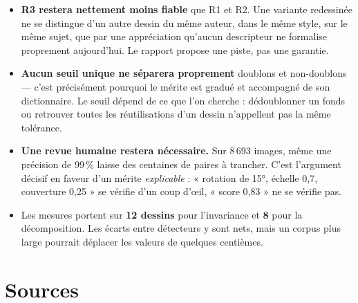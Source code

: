 \documentclass[11pt,a4paper]{article}
\newcommand{\alerte}[1]{\textcolor{alerte}{\textbf{#1}}}
\begin{document}
\begin{itemize}[leftmargin=*,itemsep=4pt]
  \item \alerte{R3 restera nettement moins fiable} que R1 et R2. Une variante
  redessinée ne se distingue d'un autre dessin du même auteur, dans le même
  style, sur le même sujet, que par une appréciation qu'aucun descripteur ne
  formalise proprement aujourd'hui. Le rapport propose une piste, pas une
  garantie.

  \item \textbf{Aucun seuil unique ne séparera proprement} doublons et
  non-doublons — c'est précisément pourquoi le mérite est gradué et accompagné
  de son dictionnaire. Le seuil dépend de ce que l'on cherche : dédoublonner un
  fonds ou retrouver toutes les réutilisations d'un dessin n'appellent pas la
  même tolérance.

  \item \textbf{Une revue humaine restera nécessaire.} Sur 8\,693 images, même
  une précision de 99\,\% laisse des centaines de paires à trancher. C'est
  l'argument décisif en faveur d'un mérite \emph{explicable} : « rotation de
  15°, échelle 0,7, couverture 0,25 » se vérifie d'un coup d'\oe il, « score
  0,83 » ne se vérifie pas.

  \item Les mesures portent sur \textbf{12 dessins} pour l'invariance et
  \textbf{8} pour la décomposition. Les écarts entre détecteurs y sont nets,
  mais un corpus plus large pourrait déplacer les valeurs de quelques
  centièmes.
\end{itemize}

\section*{Sources}
\end{document}
